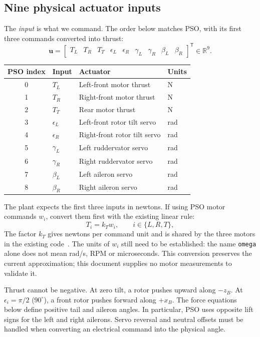 \documentclass[11pt,a4paper]{article}
\numberwithin{equation}{section}
\newcommand{\vect}[1]{\boldsymbol{#1}}
\newcommand{\R}{\mathbb{R}}
\newcommand{\trans}{^{\mathsf T}}
\begin{document}
\subsection{Nine physical actuator inputs}
The \emph{input} is what we command. The order below matches PSO, with its
first three commands converted into thrust:
\begin{equation}\label{eq:inputs}
  \vect u=
  \begin{bmatrix}
    T_L&T_R&T_T&\epsilon_L&\epsilon_R&\gamma_L&\gamma_R&\beta_L&\beta_R
  \end{bmatrix}\trans\in\R^9.
\end{equation}
\begin{center}
\begin{tabular}{clll}
\hline
PSO index & Input & Actuator & Units \\
\hline
0 & $T_L$ & Left-front motor thrust & N \\
1 & $T_R$ & Right-front motor thrust & N \\
2 & $T_T$ & Rear motor thrust & N \\
3 & $\epsilon_L$ & Left-front rotor tilt servo & rad \\
4 & $\epsilon_R$ & Right-front rotor tilt servo & rad \\
5 & $\gamma_L$ & Left ruddervator servo & rad \\
6 & $\gamma_R$ & Right ruddervator servo & rad \\
7 & $\beta_L$ & Left aileron servo & rad \\
8 & $\beta_R$ & Right aileron servo & rad \\
\hline
\end{tabular}
\end{center}
The plant expects the first three inputs in newtons. If using PSO motor
commands $w_i$, convert them first with the existing linear rule:
\begin{equation}\label{eq:pso-map}
  T_i=k_T w_i,\qquad i\in\{L,R,T\},
\end{equation}
The factor $k_T$ gives newtons per command unit and is shared by the three
motors in the existing code~\cite{pso,config}. The units of $w_i$ still need
to be established: the name \texttt{omega} alone does not mean rad/s, RPM
or microseconds. This conversion preserves the current approximation;
this document supplies no motor measurements to validate it.

Thrust cannot be negative. At zero tilt, a rotor pushes upward along $-z_B$.
At $\epsilon_i=\pi/2$ ($90^\circ$), a front rotor pushes forward along $+x_B$.
The force equations below define positive tail and aileron angles. In
particular, PSO uses opposite lift signs for the left and right ailerons.
Servo reversal and neutral offsets must be handled when converting an
electrical command into the physical angle.
\end{document}
